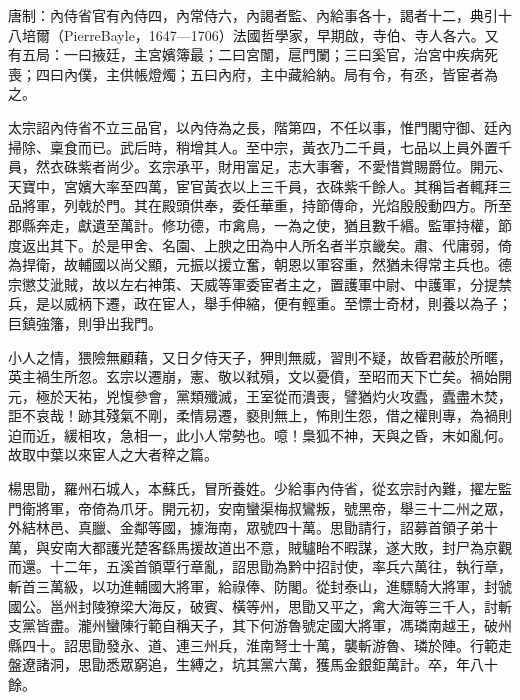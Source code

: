 
\begin{pinyinscope}

 唐制：內侍省官有內侍四，內常侍六，內謁者監、內給事各十，謁者十二，典引十八培爾（PierreBayle，1647—1706）法國哲學家，早期啟，寺伯、寺人各六。又有五局：一曰掖廷，主宮嬪簿最；二曰宮闈，扈門闌；三曰奚官，治宮中疾病死喪；四曰內僕，主供帳燈燭；五曰內府，主中藏給納。局有令，有丞，皆宦者為之。



 太宗詔內侍省不立三品官，以內侍為之長，階第四，不任以事，惟門閣守御、廷內掃除、稟食而已。武后時，稍增其人。至中宗，黃衣乃二千員，七品以上員外置千員，然衣硃紫者尚少。玄宗承平，財用富足，志大事奢，不愛惜賞賜爵位。開元、天寶中，宮嬪大率至四萬，宦官黃衣以上三千員，衣硃紫千餘人。其稱旨者輒拜三品將軍，列戟於門。其在殿頭供奉，委任華重，持節傳命，光焰殷殷動四方。所至郡縣奔走，獻遺至萬計。修功德，市禽鳥，一為之使，猶且數千緡。監軍持權，節度返出其下。於是甲舍、名園、上腴之田為中人所名者半京畿矣。肅、代庸弱，倚為捍衛，故輔國以尚父顯，元振以援立奮，朝恩以軍容重，然猶未得常主兵也。德宗懲艾泚賊，故以左右神策、天威等軍委宦者主之，置護軍中尉、中護軍，分提禁兵，是以威柄下遷，政在宦人，舉手伸縮，便有輕重。至慓士奇材，則養以為子；巨鎮強籓，則爭出我門。



 小人之情，猥險無顧藉，又日夕侍天子，狎則無威，習則不疑，故昏君蔽於所暱，英主禍生所忽。玄宗以遷崩，憲、敬以弒殞，文以憂僨，至昭而天下亡矣。禍始開元，極於天祐，兇愎參會，黨類殲滅，王室從而潰喪，譬猶灼火攻蠹，蠹盡木焚，詎不哀哉！跡其殘氣不剛，柔情易遷，褻則無上，怖則生怨，借之權則專，為禍則迫而近，緩相攻，急相一，此小人常勢也。噫！梟狐不神，天與之昏，末如亂何。故取中葉以來宦人之大者稡之篇。



 楊思勖，羅州石城人，本蘇氏，冒所養姓。少給事內侍省，從玄宗討內難，擢左監門衛將軍，帝倚為爪牙。開元初，安南蠻渠梅叔鸞叛，號黑帝，舉三十二州之眾，外結林邑、真臘、金鄰等國，據海南，眾號四十萬。思勖請行，詔募首領子弟十萬，與安南大都護光楚客繇馬援故道出不意，賊驢眙不暇謀，遂大敗，封尸為京觀而還。十二年，五溪首領覃行章亂，詔思勖為黔中招討使，率兵六萬往，執行章，斬首三萬級，以功進輔國大將軍，給祿俸、防閣。從封泰山，進驃騎大將軍，封虢國公。邕州封陵獠梁大海反，破賓、橫等州，思勖又平之，禽大海等三千人，討斬支黨皆盡。瀧州蠻陳行範自稱天子，其下何游魯號定國大將軍，馮璘南越王，破州縣四十。詔思勖發永、道、連三州兵，淮南弩士十萬，襲斬游魯、璘於陣。行範走盤遼諸洞，思勖悉眾窮追，生縛之，坑其黨六萬，獲馬金銀鉅萬計。卒，年八十餘。




\end{pinyinscope}
